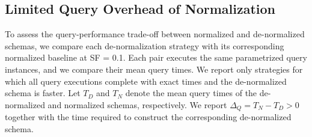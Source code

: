 \documentclass[sigconf]{acmart}
\begin{document}
\subsection{Limited Query Overhead of Normalization}

To assess the query-performance trade-off between normalized and de-normalized
schemas, we compare each de-normalization strategy with its corresponding
normalized baseline at SF = 0.1. Each pair executes the same parametrized
query instances, and we compare their mean query times. We report only
strategies for which all query executions complete with exact times and the
de-normalized schema is faster. Let $T_D$ and $T_N$ denote the mean query times
of the de-normalized and normalized schemas, respectively. We report
$\Delta_Q=T_N-T_D>0$ together with the time required to construct the
corresponding de-normalized schema.
\end{document}
